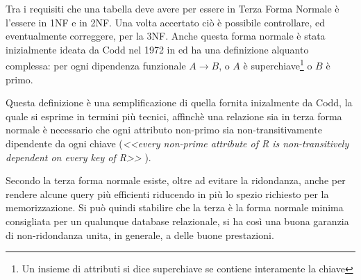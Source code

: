 Tra i requisiti che una tabella deve avere per essere in Terza Forma Normale è l'essere in 1NF e in 2NF. Una volta accertato ciò è possibile controllare, ed eventualmente correggere, per la 3NF. Anche questa forma normale è stata inizialmente ideata da Codd nel 1972 in \cite{codd:relationalmodel} ed ha una definizione alquanto complessa: per ogni dipendenza funzionale $A \rightarrow B$, o $A$ è superchiave\footnote{Un insieme di attributi si dice superchiave se contiene interamente la chiave} o $B$ è primo. 

Questa definizione è una semplificazione di quella fornita inizalmente da Codd, la quale si esprime in termini più tecnici, affinchè una relazione sia in terza forma normale è necessario che ogni attributo non-primo sia non-transitivamente dipendente da ogni chiave (\emph{<<every non-prime attribute of R is non-transitively dependent on every key of R>>} \cite{codd:relationalmodel}).

Secondo \textcite{techopedia} la terza forma normale esiste, oltre ad evitare la ridondanza, anche per rendere alcune query più efficienti riducendo in più lo spezio richiesto per la memorizzazione. Si può quindi stabilire che la terza è la forma normale minima consigliata per un qualunque database relazionale, si ha così una buona garanzia di non-ridondanza unita, in generale, a delle buone prestazioni.